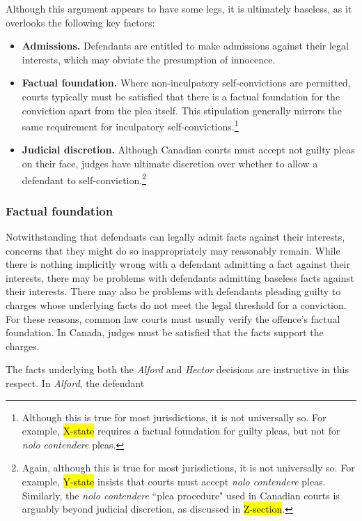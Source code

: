 Although this argument appears to have some legs, it is ultimately baseless, as it overlooks the following key factors:

\begin{itemize}
    \item \textbf{Admissions.} Defendants are entitled to make admissions against their legal interests, which may obviate the presumption of innocence.
    \item \textbf{Factual foundation.} Where non-inculpatory self-convictions are permitted, courts typically must be satisfied that there is a factual foundation for the conviction apart from the plea itself. This stipulation generally mirrors the same requirement for inculpatory self-convictions.\footnote{Although this is true for most jurisdictions, it is not universally so. For example, \hl{X-state} requires a factual foundation for guilty pleas, but not for \textit{nolo contendere} pleas.} 
    \item \textbf{Judicial discretion.} Although Canadian courts must accept not guilty pleas on their face, judges have ultimate discretion over whether to allow a defendant to self-conviction.\footnote{Again, although this is true for most jurisdictions, it is not universally so. For example, \hl{Y-state} insists that courts must accept \textit{nolo contendere} pleas. Similarly, the \textit{nolo contendere} ``plea procedure" used in Canadian courts is arguably beyond judicial discretion, as discussed in \hl{Z-section}.}
\end{itemize}

\subsubsection{Factual foundation}

Notwithstanding that defendants can legally admit facts against their interests, concerns that they might do so inappropriately may reasonably remain. While there is nothing implicitly wrong with a defendant admitting a fact against their interests, there may be problems with defendants admitting baseless facts against their interests. There may also be problems with defendants pleading guilty to charges whose underlying facts do not meet the legal threshold for a conviction. For these reasons, common law courts must usually verify the offence's factual foundation. In Canada, judges must be satisfied that the facts support the charges.

The facts underlying both the \textit{Alford} and \textit{Hector} decisions are instructive in this respect. In \textit{Alford}, the defendant 

